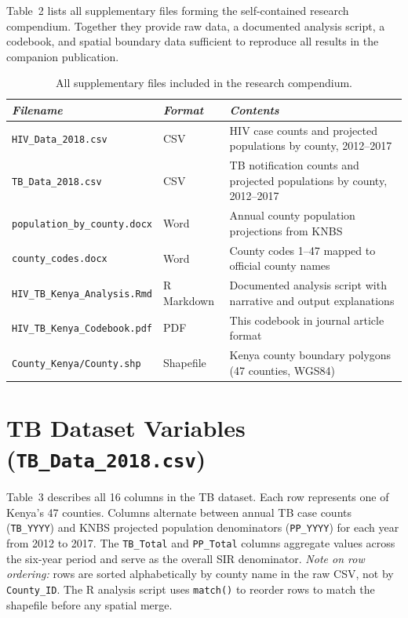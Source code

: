 \documentclass[11pt,a4paper]{article}
\newcommand{\code}[1]{\texttt{\small #1}}
\begin{document}
Table~2 lists all supplementary files forming the self-contained research
compendium. Together they provide raw data, a documented analysis script,
a codebook, and spatial boundary data sufficient to reproduce all results
in the companion publication.

\begin{table}[H]
\caption{All supplementary files included in the research compendium.}
\renewcommand{\arraystretch}{1.10}
\scriptsize\begin{tabularx}{\textwidth}{@{}L{5.0cm}L{1.8cm}X@{}}
\toprule
\textit{Filename} & \textit{Format} & \textit{Contents}\\
\midrule
\code{HIV\_Data\_2018.csv}             & CSV        & HIV case counts and projected populations by county, 2012--2017\\
\code{TB\_Data\_2018.csv}              & CSV        & TB notification counts and projected populations by county, 2012--2017\\
\code{population\_by\_county.docx}     & Word       & Annual county population projections from KNBS\\
\code{county\_codes.docx}              & Word       & County codes 1--47 mapped to official county names\\
\code{HIV\_TB\_Kenya\_Analysis.Rmd}    & R Markdown & Documented analysis script with narrative and output explanations\\
\code{HIV\_TB\_Kenya\_Codebook.pdf}    & PDF        & This codebook in journal article format\\
\code{County\_Kenya/County.shp}        & Shapefile  & Kenya county boundary polygons (47 counties, WGS84)\\
\bottomrule
\end{tabularx}
\renewcommand{\arraystretch}{1.10}
\end{table}

\section{TB Dataset Variables (\texttt{TB\_Data\_2018.csv})}

Table~3 describes all 16 columns in the TB dataset. Each row represents one
of Kenya's 47 counties. Columns alternate between annual TB case counts
(\code{TB\_YYYY}) and KNBS projected population denominators (\code{PP\_YYYY})
for each year from 2012 to 2017. The \code{TB\_Total} and \code{PP\_Total}
columns aggregate values across the six-year period and serve as the overall
SIR denominator. \textit{Note on row ordering:} rows are sorted alphabetically
by county name in the raw CSV, not by \code{County\_ID}. The R analysis script
uses \code{match()} to reorder rows to match the shapefile before any spatial
merge.
\end{document}
